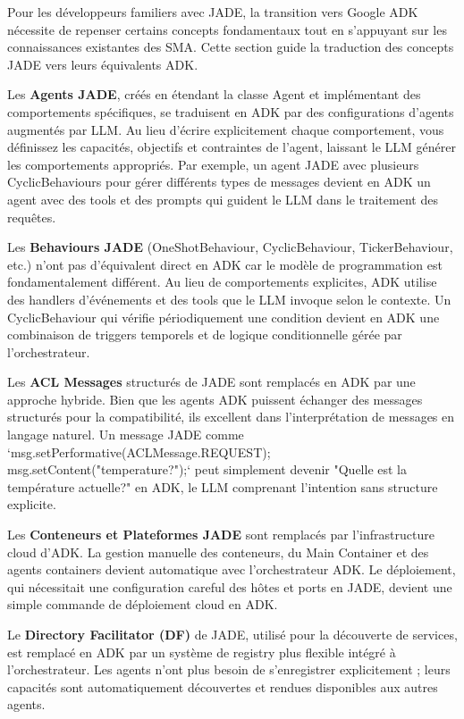 Pour les développeurs familiers avec JADE, la transition vers Google ADK nécessite de repenser certains concepts fondamentaux tout en s'appuyant sur les connaissances existantes des SMA. Cette section guide la traduction des concepts JADE vers leurs équivalents ADK.

Les \textbf{Agents JADE}, créés en étendant la classe Agent et implémentant des comportements spécifiques, se traduisent en ADK par des configurations d'agents augmentés par LLM. Au lieu d'écrire explicitement chaque comportement, vous définissez les capacités, objectifs et contraintes de l'agent, laissant le LLM générer les comportements appropriés. Par exemple, un agent JADE avec plusieurs CyclicBehaviours pour gérer différents types de messages devient en ADK un agent avec des tools et des prompts qui guident le LLM dans le traitement des requêtes.

Les \textbf{Behaviours JADE} (OneShotBehaviour, CyclicBehaviour, TickerBehaviour, etc.) n'ont pas d'équivalent direct en ADK car le modèle de programmation est fondamentalement différent. Au lieu de comportements explicites, ADK utilise des handlers d'événements et des tools que le LLM invoque selon le contexte. Un CyclicBehaviour qui vérifie périodiquement une condition devient en ADK une combinaison de triggers temporels et de logique conditionnelle gérée par l'orchestrateur.

Les \textbf{ACL Messages} structurés de JADE sont remplacés en ADK par une approche hybride. Bien que les agents ADK puissent échanger des messages structurés pour la compatibilité, ils excellent dans l'interprétation de messages en langage naturel. Un message JADE comme `msg.setPerformative(ACLMessage.REQUEST); msg.setContent("temperature?");` peut simplement devenir "Quelle est la température actuelle?" en ADK, le LLM comprenant l'intention sans structure explicite.

Les \textbf{Conteneurs et Plateformes JADE} sont remplacés par l'infrastructure cloud d'ADK. La gestion manuelle des conteneurs, du Main Container et des agents containers devient automatique avec l'orchestrateur ADK. Le déploiement, qui nécessitait une configuration careful des hôtes et ports en JADE, devient une simple commande de déploiement cloud en ADK.

Le \textbf{Directory Facilitator (DF)} de JADE, utilisé pour la découverte de services, est remplacé en ADK par un système de registry plus flexible intégré à l'orchestrateur. Les agents n'ont plus besoin de s'enregistrer explicitement ; leurs capacités sont automatiquement découvertes et rendues disponibles aux autres agents.

